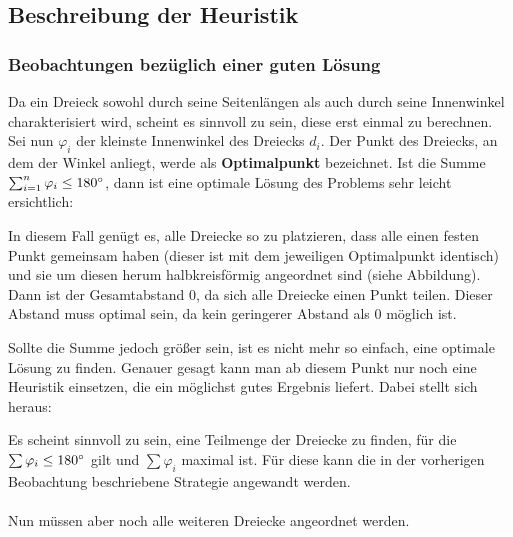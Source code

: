 \documentclass[a4paper, notitlepage, 12pt,headinclude]{scrartcl}
\begin{document}
  \subsection{Beschreibung der Heuristik}
  \subsubsection{Beobachtungen bezüglich einer guten Lösung}  
  Da ein Dreieck sowohl durch seine Seitenlängen als auch durch seine Innenwinkel charakterisiert wird, scheint es sinnvoll zu sein, diese erst einmal zu berechnen. Sei nun $\varphi_i$ der kleinste Innenwinkel des Dreiecks $d_i$. Der Punkt des Dreiecks, an dem der Winkel anliegt, werde als \textbf{Optimalpunkt} bezeichnet. Ist die Summe $\sum_{i=1}^{n} \varphi_i \leq 180\degree$, dann ist eine optimale Lösung des Problems sehr leicht ersichtlich:
  \begin{kasten}
  	In diesem Fall genügt es, alle Dreiecke so zu platzieren, dass alle einen festen Punkt gemeinsam haben (dieser ist mit dem jeweiligen Optimalpunkt identisch) und sie um diesen herum halbkreisförmig angeordnet sind (siehe Abbildung). Dann ist der Gesamtabstand $0$, da sich alle Dreiecke einen Punkt teilen. Dieser Abstand muss optimal sein, da kein geringerer Abstand als $0$ möglich ist. \\
  	{\centering
  	\par}
  \end{kasten}
 Sollte die Summe jedoch größer sein, ist es nicht mehr so einfach, eine optimale Lösung zu finden. Genauer gesagt kann man ab diesem Punkt nur noch eine Heuristik einsetzen, die ein möglichst gutes Ergebnis liefert. Dabei stellt sich heraus:
 \begin{kasten}
 	Es scheint sinnvoll zu sein, eine Teilmenge der Dreiecke zu finden, für die $\sum \varphi_i \leq 180\degree$ gilt und $\sum \varphi_i$ maximal ist. Für diese kann die in der vorherigen Beobachtung beschriebene Strategie angewandt werden. \\ \\
 	Nun müssen aber noch alle weiteren Dreiecke angeordnet werden.
 \end{kasten}
\end{document}
